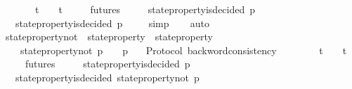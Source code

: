\begin{isabellebody}
\ \ {\isachardoublequoteopen}{\isasymforall}\ {\isasymsigma}{\isacharprime}\ {\isasymsigma}{\isachardot}\ {\isasymsigma}{\isacharprime}\ {\isasymin}\ {\isasymSigma}t\ {\isasymand}\ {\isasymsigma}\ {\isasymin}\ {\isasymSigma}t\isanewline
\ \ {\isasymlongrightarrow}\ {\isasymsigma}{\isacharprime}\ {\isasymin}\ futures\ {\isasymsigma}\ \isanewline
\ \ {\isasymlongrightarrow}\ state{\isacharunderscore}property{\isacharunderscore}is{\isacharunderscore}decided\ {\isacharparenleft}p{\isacharcomma}\ {\isasymsigma}{\isacharparenright}\isanewline
\ \ {\isasymlongrightarrow}\ state{\isacharunderscore}property{\isacharunderscore}is{\isacharunderscore}decided\ {\isacharparenleft}p{\isacharcomma}\ {\isasymsigma}{\isacharprime}{\isacharparenright}{\isachardoublequoteclose}\isanewline
%
\isadelimproof
\ \ %
\endisadelimproof
%
\isatagproof
{}\isamarkupfalse%
\ simp\isanewline
\ \ \isamarkupfalse%
\ auto%
\endisatagproof
{\isafoldproof}%
%
\isadelimproof
\isanewline
%
\endisadelimproof
\isanewline
\isanewline
{}\isamarkupfalse%
\ state{\isacharunderscore}property{\isacharunderscore}not\ {\isacharcolon}{\isacharcolon}\ {\isachardoublequoteopen}state{\isacharunderscore}property\ {\isasymRightarrow}\ state{\isacharunderscore}property{\isachardoublequoteclose}\isanewline
\ \ \isanewline
\ \ \ \ {\isachardoublequoteopen}state{\isacharunderscore}property{\isacharunderscore}not\ p\ {\isacharequal}\ {\isacharparenleft}{\isasymlambda}{\isasymsigma}{\isachardot}\ {\isacharparenleft}{\isasymnot}\ p\ {\isasymsigma}{\isacharparenright}{\isacharparenright}{\isachardoublequoteclose}\isanewline
\isanewline
{}\isamarkupfalse%
\ {\isacharparenleft}\ Protocol{\isacharparenright}\ backword{\isacharunderscore}consistency\ {\isacharcolon}\isanewline
\ \ {\isachardoublequoteopen}{\isasymforall}\ {\isasymsigma}{\isacharprime}\ {\isasymsigma}{\isachardot}\ {\isasymsigma}{\isacharprime}\ {\isasymin}\ {\isasymSigma}t\ {\isasymand}\ {\isasymsigma}\ {\isasymin}\ {\isasymSigma}t\isanewline
\ \ {\isasymlongrightarrow}\ {\isasymsigma}{\isacharprime}\ {\isasymin}\ futures\ {\isasymsigma}\ \isanewline
\ \ {\isasymlongrightarrow}\ state{\isacharunderscore}property{\isacharunderscore}is{\isacharunderscore}decided\ {\isacharparenleft}p{\isacharcomma}\ {\isasymsigma}{\isacharprime}{\isacharparenright}\isanewline
\ \ {\isasymlongrightarrow}\ {\isasymnot}state{\isacharunderscore}property{\isacharunderscore}is{\isacharunderscore}decided\ {\isacharparenleft}state{\isacharunderscore}property{\isacharunderscore}not\ p{\isacharcomma}\ {\isasymsigma}{\isacharparenright}{\isachardoublequoteclose}\isanewline

\end{isabellebody}
